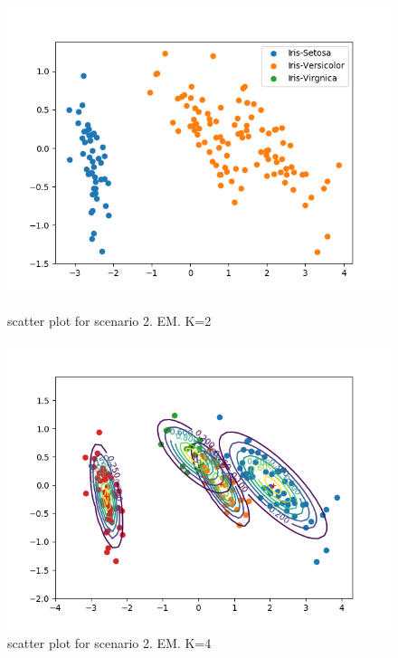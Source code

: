 \documentclass[a4paper]{article}
\begin{document}
\begin{figure}[h!]
\begin{minipage}[t]{6.5cm}
              \includegraphics[width=1.0\textwidth]{pca_em_s2_2.png}
              \caption{scatter plot for scenario 2. EM. K=2}
            \end{minipage}
            \hspace{2cm}
            \begin{minipage}[t]{6.5cm}
              \includegraphics[width=1.0\textwidth]{pca_em_s2_4.png}
              \caption{scatter plot for scenario 2. EM. K=4}
            \end{minipage}
            \begin{minipage}[t]{6.5cm}

\end{minipage}
\end{figure}
\end{document}
